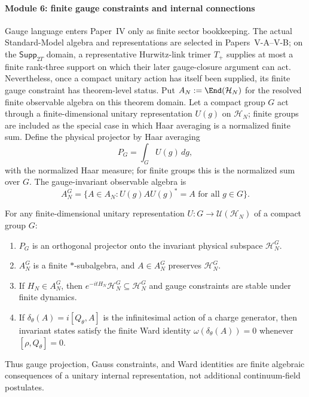 \documentclass[12pt,a4paper]{article}
\begin{document}
\paragraph{Module 6: finite gauge constraints and internal connections}
\label{p4:sec:module-finite-gauge-constraints}

Gauge language enters Paper~IV only as finite sector bookkeeping.  The actual
Standard-Model algebra and representations are selected in Papers~V-A--V-B; on
the \(\mathsf{Supp}_{2T}\) domain, a representative Hurwitz-link trimer \(T_+\)
supplies at most a finite rank-three support on which their later
gauge-closure argument can act.  Nevertheless, once a compact unitary action
has itself been supplied, its finite gauge constraint has theorem-level
status.  Put \(A_N:=\End(\mathcal H_N)\) for the resolved finite observable
algebra on this theorem domain.  Let a compact group \(G\) act through a
finite-dimensional unitary representation \(U(g)\) on \(\mathcal H_N\);
finite groups are included as the special case in which Haar averaging is a
normalized finite sum.  Define the physical projector by Haar averaging
\begin{equation}
\label{p4:eq:finite-gauge-projector}
P_G=\int_G U(g)\,dg,
\end{equation}
with the normalized Haar measure; for finite groups this is the normalized sum over \(G\).  The gauge-invariant observable algebra is
\begin{equation}
\label{p4:eq:finite-gauge-invariant-algebra}
A_N^G=\{A\in A_N: U(g)AU(g)^*=A\text{ for all }g\in G\}.
\end{equation}


\begin{theorem}
\label{p4:thm:finite-gauge-constraint-closure}
For any finite-dimensional unitary representation \(U:G\to\mathcal U(\mathcal H_N)\) of a compact group \(G\):
\begin{enumerate}
\item \(P_G\) is an orthogonal projector onto the invariant physical subspace \(\mathcal H_N^G\).
\item \(A_N^G\) is a finite \(*\)-subalgebra, and \(A\in A_N^G\) preserves \(\mathcal H_N^G\).
\item If \(H_N\in A_N^G\), then \(e^{-itH_N}\mathcal H_N^G\subseteq\mathcal H_N^G\) and gauge constraints are stable under finite dynamics.
\item If \(\delta_\theta(A)=i[Q_\theta,A]\) is the infinitesimal action of a charge generator, then invariant states satisfy the finite Ward identity \(\omega(\delta_\theta(A))=0\) whenever \([\rho,Q_\theta]=0\).
\end{enumerate}
Thus gauge projection, Gauss constraints, and Ward identities are finite algebraic consequences of a unitary internal representation, not additional continuum-field postulates.
\end{theorem}
\end{document}
